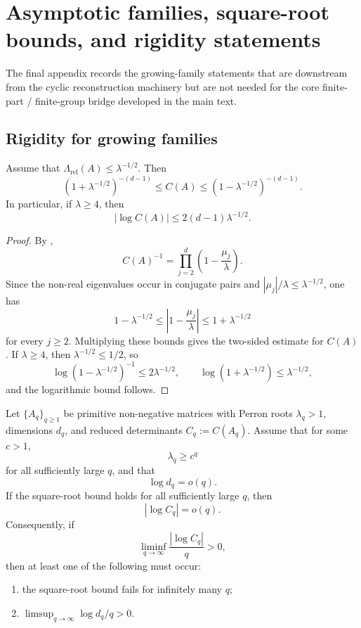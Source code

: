 \section{Asymptotic families, square-root bounds, and rigidity statements}
\label{app:rigidity}

The final appendix records the growing-family statements that are downstream from the cyclic reconstruction machinery but are not needed for the core finite-part / finite-group bridge developed in the main text.

\subsection{Rigidity for growing families}

\begin{proposition}
  \label{prop:finite-part-residue-constant-rh-squeeze}
  Assume that \(\Lambda_{\mathrm{rel}}(A)\le \lambda^{-1/2}\). Then
  \[
    (1+\lambda^{-1/2})^{-(d-1)}
    \le C(A)\le
    (1-\lambda^{-1/2})^{-(d-1)}.
  \]
  In particular, if \(\lambda\ge 4\), then
  \[
    |\log C(A)|\le 2(d-1)\lambda^{-1/2}.
  \]
\end{proposition}

\begin{proof}
  By ,
  \[
    C(A)^{-1}
    =\prod_{j=2}^d\left(1-\frac{\mu_j}{\lambda}\right).
  \]
  Since the non-real eigenvalues occur in conjugate pairs and
  \(|\mu_j|/\lambda\le \lambda^{-1/2}\), one has
  \[
    1-\lambda^{-1/2}
    \le \left|1-\frac{\mu_j}{\lambda}\right|
    \le 1+\lambda^{-1/2}
  \]
  for every \(j\ge 2\). Multiplying these bounds gives the two-sided
  estimate for \(C(A)\). If \(\lambda\ge 4\), then
  \(\lambda^{-1/2}\le 1/2\), so
  \[
    \log(1-\lambda^{-1/2})^{-1}\le 2\lambda^{-1/2},
    \qquad
    \log(1+\lambda^{-1/2})\le \lambda^{-1/2},
  \]
  and the logarithmic bound follows.
\end{proof}

\begin{theorem}
  \label{thm:finite-part-residue-drift-trichotomy}
  Let \(\{A_q\}_{q\ge 1}\) be primitive non-negative matrices with
  Perron roots \(\lambda_q>1\), dimensions \(d_q\), and reduced
  determinants \(C_q:=C(A_q)\). Assume that for some \(c>1\),
  \[
    \lambda_q\ge c^q
  \]
  for all sufficiently large \(q\), and that
  \[
    \log d_q=o(q).
  \]
  If the square-root bound holds for all sufficiently large \(q\), then
  \[
    |\log C_q|=o(q).
  \]
  Consequently, if
  \[
    \liminf_{q\to\infty}\frac{|\log C_q|}{q}>0,
  \]
  then at least one of the following must occur:
  \begin{enumerate}[label=\textup{(\roman*)}]
    \item the square-root bound fails for infinitely many \(q\);
    \item \(\limsup_{q\to\infty}\log d_q/q>0\).
  \end{enumerate}
\end{theorem}

